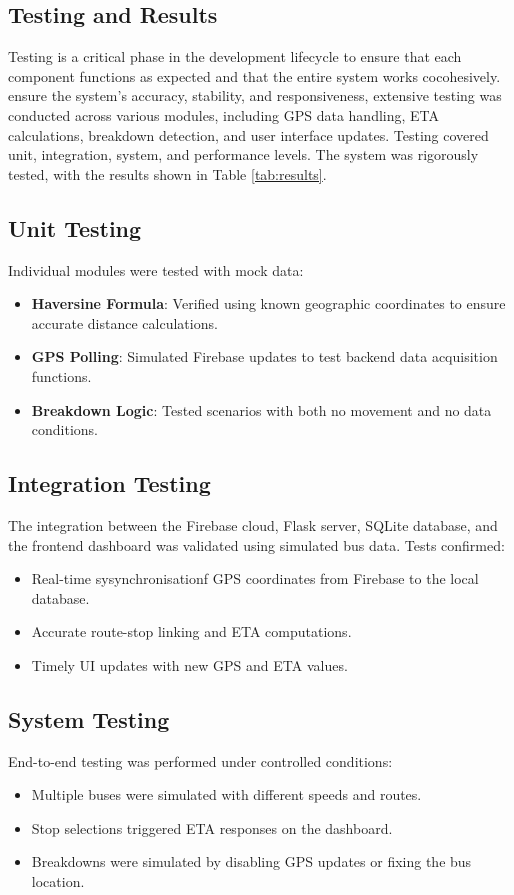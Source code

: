 \documentclass{article}
\begin{document}
\begin{multicols}{2}
\section{Testing and Results}
\vspace{0.5em}
Testing is a critical phase in the development lifecycle to ensure that each component functions as expected and that the entire system works cocohesively.  ensure the system's accuracy, stability, and responsiveness, extensive testing was conducted across various modules, including GPS data handling, ETA calculations, breakdown detection, and user interface updates. Testing covered unit, integration, system, and performance levels. The system was rigorously tested, with the results shown in Table \ref{tab:results}.

\subsection{Unit Testing}
Individual modules were tested with mock data:
\begin{itemize}
  \item \textbf{Haversine Formula}: Verified using known geographic coordinates to ensure accurate distance calculations.
  \item \textbf{GPS Polling}: Simulated Firebase updates to test backend data acquisition functions.
  \item \textbf{Breakdown Logic}: Tested scenarios with both no movement and no data conditions.
\end{itemize}

\subsection{Integration Testing}
The integration between the Firebase cloud, Flask server, SQLite database, and the frontend dashboard was validated using simulated bus data. Tests confirmed:
\begin{itemize}
  \item Real-time sysynchronisationf GPS coordinates from Firebase to the local database.
  \item Accurate route-stop linking and ETA computations.
  \item Timely UI updates with new GPS and ETA values.
\end{itemize}

\subsection{System Testing}
End-to-end testing was performed under controlled conditions:
\begin{itemize}
  \item Multiple buses were simulated with different speeds and routes.
  \item Stop selections triggered ETA responses on the dashboard.
  \item Breakdowns were simulated by disabling GPS updates or fixing the bus location.
\end{itemize}


\end{multicols}
\end{document}
